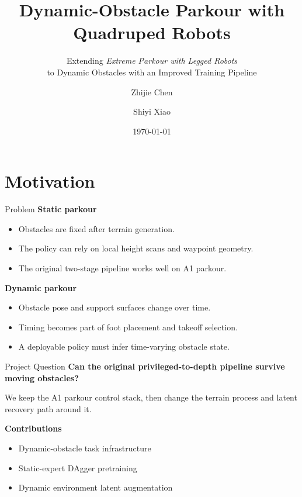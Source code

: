 \documentclass[aspectratio=169,xcolor=dvipsnames]{beamer}
\title{Dynamic-Obstacle Parkour with \\ Quadruped Robots}
\subtitle{\normalfont\small
    Extending {\normalfont \itshape Extreme Parkour with Legged Robots}\\
    to Dynamic Obstacles with an Improved Training Pipeline
}
\author{Zhijie Chen \and Shiyi Xiao}
\institute
{
    School of Artificial Intelligence \\
    Shanghai Jiao Tong University
}
\date{\today}
\begin{document}
\begin{frame}
    \titlepage
\end{frame}

\section{Motivation}

\begin{frame}{Problem}
    \textbf{Static parkour}
    \begin{itemize}
        \setlength{\itemsep}{0.35em}
        \item Obstacles are fixed after terrain generation.
        \item The policy can rely on local height scans and waypoint geometry.
        \item The original two-stage pipeline works well on A1 parkour.
    \end{itemize}

    \vspace{0.8em}
    \textbf{Dynamic parkour}
    \begin{itemize}
        \setlength{\itemsep}{0.35em}
        \item Obstacle pose and support surfaces change over time.
        \item Timing becomes part of foot placement and takeoff selection.
        \item A deployable policy must infer time-varying obstacle state.
    \end{itemize}
\end{frame}

\begin{frame}{Project Question}
    \textbf{Can the original privileged-to-depth pipeline survive moving obstacles?}

    \vspace{0.4em}
    We keep the A1 parkour control stack, then change the terrain process and latent recovery path around it.

    \vspace{0.8em}
    \textbf{Contributions}
    \begin{itemize}
        \setlength{\itemsep}{0.35em}
        \item Dynamic-obstacle task infrastructure
        \item Static-expert DAgger pretraining
        \item Dynamic environment latent augmentation
    \end{itemize}
\end{frame}
\end{document}
